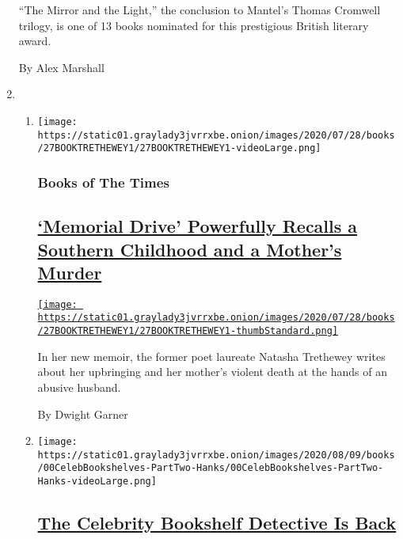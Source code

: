 \begin{enumerate}
  ``The Mirror and the Light,'' the conclusion to Mantel's Thomas
  Cromwell trilogy, is one of 13 books nominated for this prestigious
  British literary award.

  By Alex Marshall
\item
  \begin{enumerate}
  \def\labelenumii{\arabic{enumii}.}
  \item
    \texttt{[image: https://static01.graylady3jvrrxbe.onion/images/2020/07/28/books/27BOOKTRETHEWEY1/27BOOKTRETHEWEY1-videoLarge.png]}

    \hypertarget{books-of-the-times-1}{%
    \subsubsection{Books of The Times}\label{books-of-the-times-1}}

    \hypertarget{memorial-drive-powerfully-recalls-a-southern-childhood-and-a-mothers-murder}{%
    \subsection{\texorpdfstring{\href{/2020/07/27/books/review-memorial-drive-memoir-natasha-trethewey.html}{`Memorial
    Drive' Powerfully Recalls a Southern Childhood and a Mother's
    Murder}}{`Memorial Drive' Powerfully Recalls a Southern Childhood and a Mother's Murder}}\label{memorial-drive-powerfully-recalls-a-southern-childhood-and-a-mothers-murder}}

    \href{/2020/07/27/books/review-memorial-drive-memoir-natasha-trethewey.html}{\texttt{[image: https://static01.graylady3jvrrxbe.onion/images/2020/07/28/books/27BOOKTRETHEWEY1/27BOOKTRETHEWEY1-thumbStandard.png]}}

    In her new memoir, the former poet laureate Natasha Trethewey writes
    about her upbringing and her mother's violent death at the hands of
    an abusive husband.

    By Dwight Garner
  \item
    \texttt{[image: https://static01.graylady3jvrrxbe.onion/images/2020/08/09/books/00CelebBookshelves-PartTwo-Hanks/00CelebBookshelves-PartTwo-Hanks-videoLarge.png]}

    \hypertarget{the-celebrity-bookshelf-detective-is-back}{%
    \subsection{\texorpdfstring{\href{/2020/07/27/books/tom-hanks-gwyneth-paltrow-bookshelves.html}{The
    Celebrity Bookshelf Detective Is
    Back}}{The Celebrity Bookshelf Detective Is Back}}\label{the-celebrity-bookshelf-detective-is-back}}


\end{enumerate}
\end{enumerate}
